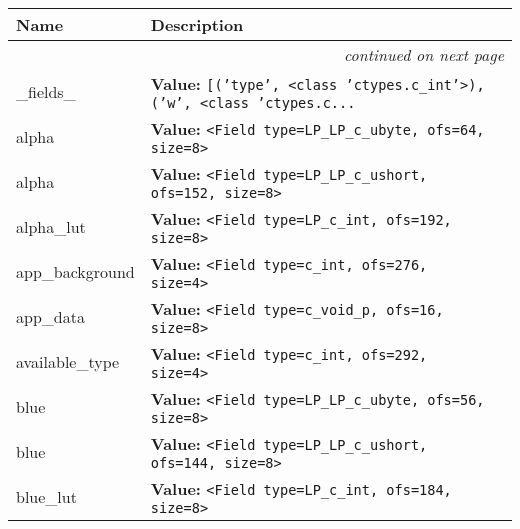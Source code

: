     \vspace{-1cm}
\hspace{\varindent}\begin{longtable}{|p{\varnamewidth}|p{\vardescrwidth}|l}
\cline{1-2}
\cline{1-2} \centering \textbf{Name} & \centering \textbf{Description}& \\
\cline{1-2}
\endhead\cline{1-2}\multicolumn{3}{r}{\small\textit{continued on next page}}\\\endfoot\cline{1-2}
\endlastfoot\raggedright \_\-f\-i\-e\-l\-d\-s\-\_\- & \raggedright \textbf{Value:} 
{\tt \texttt{[}\texttt{(}\texttt{'}\texttt{type}\texttt{'}\texttt{, }{\textless}class 'ctypes.c\_int'{\textgreater}\texttt{)}\texttt{, }\texttt{(}\texttt{'}\texttt{w}\texttt{'}\texttt{, }{\textless}class 'ctypes.c\texttt{...}}&\\
\cline{1-2}
\raggedright a\-l\-p\-h\-a\- & \raggedright \textbf{Value:} 
{\tt {\textless}Field type=LP\_LP\_c\_ubyte, ofs=64, size=8{\textgreater}}&\\
\cline{1-2}
\raggedright a\-l\-p\-h\-a\-1\-6\- & \raggedright \textbf{Value:} 
{\tt {\textless}Field type=LP\_LP\_c\_ushort, ofs=152, size=8{\textgreater}}&\\
\cline{1-2}
\raggedright a\-l\-p\-h\-a\-\_\-l\-u\-t\- & \raggedright \textbf{Value:} 
{\tt {\textless}Field type=LP\_c\_int, ofs=192, size=8{\textgreater}}&\\
\cline{1-2}
\raggedright a\-p\-p\-\_\-b\-a\-c\-k\-g\-r\-o\-u\-n\-d\- & \raggedright \textbf{Value:} 
{\tt {\textless}Field type=c\_int, ofs=276, size=4{\textgreater}}&\\
\cline{1-2}
\raggedright a\-p\-p\-\_\-d\-a\-t\-a\- & \raggedright \textbf{Value:} 
{\tt {\textless}Field type=c\_void\_p, ofs=16, size=8{\textgreater}}&\\
\cline{1-2}
\raggedright a\-v\-a\-i\-l\-a\-b\-l\-e\-\_\-t\-y\-p\-e\- & \raggedright \textbf{Value:} 
{\tt {\textless}Field type=c\_int, ofs=292, size=4{\textgreater}}&\\
\cline{1-2}
\raggedright b\-l\-u\-e\- & \raggedright \textbf{Value:} 
{\tt {\textless}Field type=LP\_LP\_c\_ubyte, ofs=56, size=8{\textgreater}}&\\
\cline{1-2}
\raggedright b\-l\-u\-e\-1\-6\- & \raggedright \textbf{Value:} 
{\tt {\textless}Field type=LP\_LP\_c\_ushort, ofs=144, size=8{\textgreater}}&\\
\cline{1-2}
\raggedright b\-l\-u\-e\-\_\-l\-u\-t\- & \raggedright \textbf{Value:} 
{\tt {\textless}Field type=LP\_c\_int, ofs=184, size=8{\textgreater}}&\\

\end{longtable}
